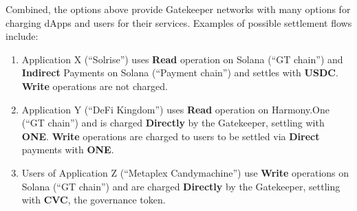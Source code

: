 \clearpage

Combined, the options above provide Gatekeeper networks with many options for charging dApps and users for their services. Examples of possible settlement flows include:

\begin{enumerate}
\item Application X (“Solrise”) uses \textbf{Read} operation on Solana (“GT chain”) and \textbf{Indirect} Payments on Solana (“Payment chain”) and settles with \textbf{USDC}. \textbf{Write} operations are not charged.
\item Application Y (“DeFi Kingdom”) uses \textbf{Read} operation on Harmony.One (“GT chain”) and is charged \textbf{Directly} by the Gatekeeper, settling with \textbf{ONE}. \textbf{Write} operations are charged to users to be settled via \textbf{Direct} payments with \textbf{ONE}.
\item Users of Application Z (“Metaplex Candymachine”) use \textbf{Write} operations on Solana (“GT chain”) and are charged \textbf{Directly} by the Gatekeeper, settling with \textbf{CVC}, the governance token.
\end{enumerate}

